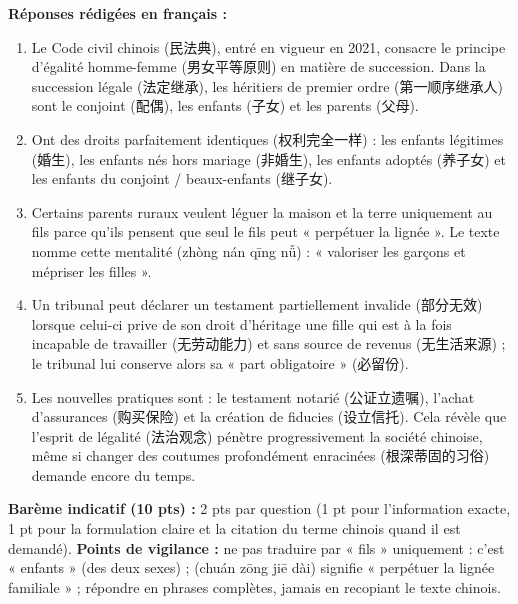 \documentclass[11pt]{article}
\newcommand{\zh}[1]{\ifmmode\text{#1}\else{#1}\fi}
\begin{document}
\begin{corrige}
\textbf{Réponses rédigées en français :}
\begin{enumerate}
    \item Le Code civil chinois (民法典), entré en vigueur en 2021, consacre le principe d'égalité homme-femme (男女平等原则) en matière de succession. Dans la succession légale (法定继承), les héritiers de premier ordre (第一顺序继承人) sont le conjoint (配偶), les enfants (子女) et les parents (父母).
    \item Ont des droits parfaitement identiques (权利完全一样) : les enfants légitimes (婚生), les enfants nés hors mariage (非婚生), les enfants adoptés (养子女) et les enfants du conjoint / beaux-enfants (继子女).
    \item Certains parents ruraux veulent léguer la maison et la terre uniquement au fils parce qu'ils pensent que seul le fils peut « perpétuer la lignée ». Le texte nomme cette mentalité \zh{重男轻女} (zhòng nán qīng nǚ) : « valoriser les garçons et mépriser les filles ».
    \item Un tribunal peut déclarer un testament partiellement invalide (部分无效) lorsque celui-ci prive de son droit d'héritage une fille qui est à la fois incapable de travailler (无劳动能力) et sans source de revenus (无生活来源) ; le tribunal lui conserve alors sa « part obligatoire » (必留份).
    \item Les nouvelles pratiques sont : le testament notarié (公证立遗嘱), l'achat d'assurances (购买保险) et la création de fiducies (设立信托). Cela révèle que l'esprit de légalité (法治观念) pénètre progressivement la société chinoise, même si changer des coutumes profondément enracinées (根深蒂固的习俗) demande encore du temps.
\end{enumerate}
\textbf{Barème indicatif (10 pts) :} 2 pts par question (1 pt pour l'information exacte, 1 pt pour la formulation claire et la citation du terme chinois quand il est demandé).
\textbf{Points de vigilance :} ne pas traduire \zh{子女} par « fils » uniquement : c'est « enfants » (des deux sexes) ; \zh{传宗接代} (chuán zōng jiē dài) signifie « perpétuer la lignée familiale » ; répondre en phrases complètes, jamais en recopiant le texte chinois.
\end{corrige}
\end{document}
